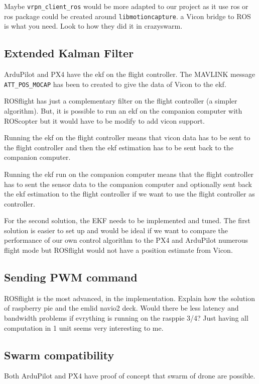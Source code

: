 Maybe \texttt{vrpn\_client\_ros} would be more adapted to our project as it use ros or ros package could be created around \texttt{libmotioncapture}.
{\color{red}a Vicon bridge to ROS is what you need. Look to how they did it in crazyswarm.}

\subsection{Extended Kalman Filter}
ArduPilot and PX4 have the \gls{ekf} on the flight controller.
The MAVLINK message \texttt{ATT\_POS\_MOCAP} has been to created to give the data of Vicon to the \gls{ekf}.

ROSflight has just a complementary filter on the flight controller (a simpler algorithm).
But, it is possible to run an \gls{ekf} on the companion computer with ROScopter but it would have to be modify to add vicon support.

Running the \gls{ekf} on the flight controller means that vicon data has to be sent to the flight controller and then the \gls{ekf} estimation has to be sent back to the companion computer.

Running the \gls{ekf} run on the companion computer means that the flight controller has to sent the sensor data to the companion computer and optionally sent back the \gls{ekf} estimation to the flight controller if we want to use the flight controller as controller.

For the second solution, the EKF needs to be implemented and tuned.
The first solution is easier to set up and would be ideal if we want to compare the performance of our own control algorithm to the PX4 and ArduPilot numerous flight mode but ROSflight would not have a position estimate from Vicon.

\subsection{Sending PWM command}
ROSflight is the most advanced, in the implementation.
{\color{red}Explain how the solution of raspberry pie and the emlid navio2 deck. Would there be less latency and bandwidth problems if evrything is running on the rasppie 3/4? Just having all computation in 1 unit seems very interesting to me.}

\subsection{Swarm compatibility}
Both ArduPilot \cite{ardupilot_multi_vehicle} and PX4 \cite{px4_multi_vehicle}
have proof of concept that swarm of drone are possible.

